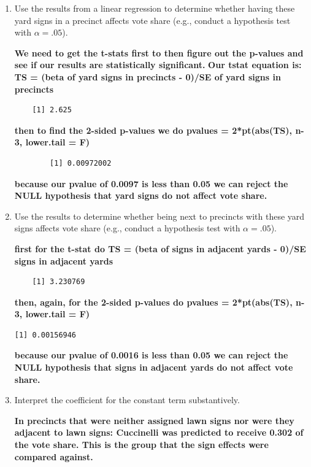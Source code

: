 \documentclass[12pt,letterpaper]{article}
\begin{document}
\vspace{.5cm}
\begin{enumerate}
	\item [(a)] Use the results from a linear regression to determine whether having these yard signs in a precinct affects vote share (e.g., conduct a hypothesis test with $\alpha = .05$).
	
	\textbf{We need to get the t-stats first to then figure out the p-values and see if our results are statistically significant.}
	\textbf{Our tstat equation is: TS = (beta of yard signs in precincts - 0)/SE of yard signs in precincts}
		
	\begin{verbatim}
	[1] 2.625
	\end{verbatim}
	\textbf{then to find the 2-sided p-values we do pvalues = 2*pt(abs(TS), n-3, lower.tail = F)}
	
		\begin{verbatim}
		[1] 0.00972002
		\end{verbatim}
	\textbf{because our pvalue of 0.0097 is less than 0.05 we can reject the NULL hypothesis that yard signs do not affect vote share.}	
	\item [(b)]  Use the results to determine whether being
	next to precincts with these yard signs affects vote
	share (e.g., conduct a hypothesis test with $\alpha = .05$).
	
	\textbf{first for the t-stat do TS = (beta of signs in adjacent yards - 0)/SE signs in adjacent yards}
	
			\begin{verbatim}
	[1] 3.230769
	\end{verbatim}
	
	\textbf{then, again, for the 2-sided p-values do pvalues = 2*pt(abs(TS), n-3, lower.tail = F)}

		\begin{verbatim}
[1] 0.00156946
\end{verbatim}
	\textbf{because our pvalue of 0.0016 is less than 0.05 we can reject the NULL hypothesis that signs in adjacent yards do not affect vote share.}
	\item [(c)] Interpret the coefficient for the constant term substantively.

		\textbf{In precincts that were neither assigned lawn signs nor were they adjacent to lawn signs: Cuccinelli was predicted to receive 0.302 of the vote share. This is the group that the sign effects were compared against.}
	

\end{enumerate}
\end{document}
